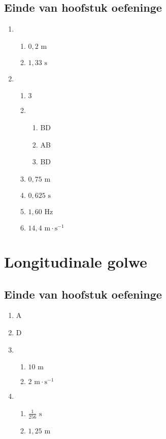 \subsection{Einde van hoofstuk oefeninge} 
\begin{multicols}{4}
\begin{enumerate}[noitemsep, label=\textbf{\arabic*}. ] 
\item %
 \begin{enumerate}[noitemsep, label=\textbf{(\alph*)} ]
\item $0,2 \text{ m}$
\item $1,33 \text{ s}$
\end{enumerate}
\item %
 \begin{enumerate}[noitemsep, label=\textbf{(\alph*)} ]
\item $3$
\item 
\begin{enumerate}[noitemsep, label=\textbf{(\roman*)} ]
\item BD
\item AB
\item BD
\end{enumerate}
\item $0,75 \text{ m}$
\item $0,625 \text{ s}$
\item $1,60 \text{ Hz}$
\item $14,4 \text{ m} \cdot \text{s}^{-1}$
\end{enumerate}
\end{enumerate}
\end{multicols}
\section{Longitudinale golwe}
\subsection{Einde van hoofstuk oefeninge} 
\begin{multicols}{3}
  \begin{enumerate}[noitemsep, label=\textbf{\arabic*}.]
  \item %
A
  \item %
D
  \item %
\begin{enumerate}[noitemsep, label=\textbf{\alph*}.]
 \item $10 \text{ m}$
\item $2 \text{ m} \cdot \text{s}^{-1}$
\end{enumerate} 
  \item %
\begin{enumerate}[noitemsep, label=\textbf{\alph*}.]
 \item $\frac{1}{256} \text{ s}$
\item $1,25 \text{ m}$
\end{enumerate}
  \end{enumerate}
\end{multicols}
